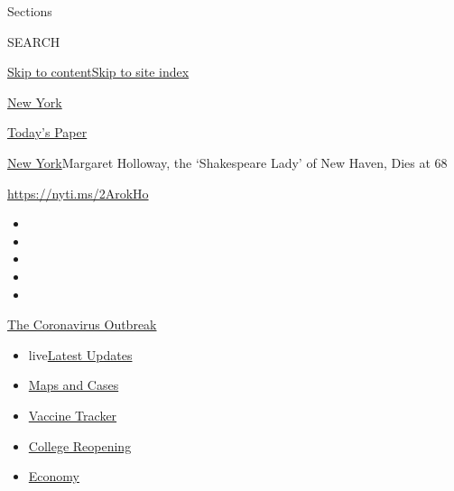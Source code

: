Sections

SEARCH

\protect\hyperlink{site-content}{Skip to
content}\protect\hyperlink{site-index}{Skip to site index}

\href{https://www.nytimes.com/section/nyregion}{New York}

\href{https://myaccount.nytimes.com/auth/login?response_type=cookie\&client_id=vi}{}

\href{https://www.nytimes.com/section/todayspaper}{Today's Paper}

\href{/section/nyregion}{New York}\textbar{}Margaret Holloway, the
`Shakespeare Lady' of New Haven, Dies at 68

\url{https://nyti.ms/2ArokHo}

\begin{itemize}
\item
\item
\item
\item
\item
\end{itemize}

\href{https://www.nytimes.com/news-event/coronavirus?action=click\&pgtype=Article\&state=default\&region=TOP_BANNER\&context=storylines_menu}{The
Coronavirus Outbreak}

\begin{itemize}
\tightlist
\item
  live\href{https://www.nytimes.com/2020/08/03/world/coronavirus-covid-19.html?action=click\&pgtype=Article\&state=default\&region=TOP_BANNER\&context=storylines_menu}{Latest
  Updates}
\item
  \href{https://www.nytimes.com/interactive/2020/us/coronavirus-us-cases.html?action=click\&pgtype=Article\&state=default\&region=TOP_BANNER\&context=storylines_menu}{Maps
  and Cases}
\item
  \href{https://www.nytimes.com/interactive/2020/science/coronavirus-vaccine-tracker.html?action=click\&pgtype=Article\&state=default\&region=TOP_BANNER\&context=storylines_menu}{Vaccine
  Tracker}
\item
  \href{https://www.nytimes.com/2020/08/02/us/covid-college-reopening.html?action=click\&pgtype=Article\&state=default\&region=TOP_BANNER\&context=storylines_menu}{College
  Reopening}
\item
  \href{https://www.nytimes.com/live/2020/08/03/business/stock-market-today-coronavirus?action=click\&pgtype=Article\&state=default\&region=TOP_BANNER\&context=storylines_menu}{Economy}
\end{itemize}

